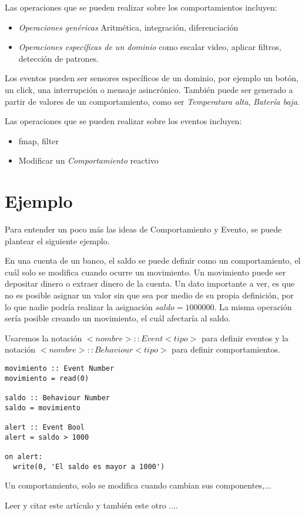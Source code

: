 Las operaciones que se pueden realizar sobre los comportamientos incluyen:
\begin{itemize}
\item \textit{Operaciones genéricas} Aritmética, integración, diferenciación
\item \textit{Operaciones específicas de un dominio} como escalar video, aplicar filtros, detección de patrones.
\end{itemize}

Los eventos pueden ser sensores específicos de un dominio, por ejemplo un
botón, un click, una interrupción o mensaje asincrónico.
También puede ser generado a partir de valores de un comportamiento,
como ser \emph{Temperatura alta}, \emph{Batería baja}.

Las operaciones que se pueden realizar sobre los eventos incluyen:
\begin{itemize}
\item fmap, filter
\item Modificar un \emph{Comportamiento} reactivo
\end{itemize}


\section{Ejemplo}

Para entender un poco más las ideas de Comportamiento y Evento, se puede
plantear el siguiente ejemplo.

  En una cuenta de un banco, el saldo se puede definir
como un comportamiento, el cuál solo se modifica cuando ocurre
un movimiento.
  Un movimiento puede ser depositar dinero o extraer
dinero de la cuenta.
  Un dato importante a ver, es que no es posible asignar un valor
sin que sea por medio de su propia definición, por lo que nadie
podría realizar la asignación $saldo = 1000000$.
  La misma operación sería posible creando un movimiento, el cuál
afectaría al saldo.

  Usaremos la notación $<nombre> :: Event <tipo>$ para definir
eventos y la notación $<nombre> :: Behaviour <tipo>$ para
definir comportamientos.

\begin{verbatim}
movimiento :: Event Number
movimiento = read(0)

saldo :: Behaviour Number
saldo = movimiento

alert :: Event Bool
alert = saldo > 1000

on alert:
  write(0, 'El saldo es mayor a 1000')

\end{verbatim}

Un comportamiento, solo se modifica cuando cambian sus componentes,...


Leer y citar este artículo \cite{peterson99:lambdainmotion} y también este otro
\cite{evanczaplicki2012:Elm}....



